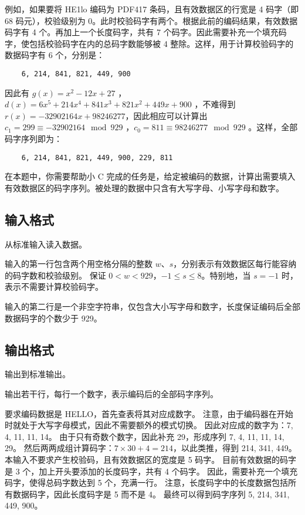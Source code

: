 例如，如果要将 HE1lo 编码为 PDF417 条码，且有效数据区的行宽是 4 码字（即 68 码元），校验级别为 0。此时校验码字有两个。根据此前的编码结果，有效数据码字有 4 个。再加上一个长度码字，共有 7 个码字。因此需要补充一个填充码字，使包括校验码字在内的总码字数能够被 4 整除。这样，用于计算校验码字的数据码字有 6 个，分别是：

\begin{lstlisting}
    6, 214, 841, 821, 449, 900
\end{lstlisting}

因此有 $g(x)=x^2-12x+27$
，$d(x)=6x^5+214x^4+841x^3+821x^2+449x+900$
，不难得到 $r(x)=-32902164x+98246277$，因此相应可以计算出 $c_1=299\equiv -32902164\mod 929$
，$c_0=811\equiv 98246277\mod 929$
。这样，全部码字序列即为：

\begin{lstlisting}
    6, 214, 841, 821, 449, 900, 229, 811
\end{lstlisting}

在本题中，你需要帮助小 C 完成的任务是，给定被编码的数据，计算出需要填入有效数据区的码字序列。被处理的数据中只含有大写字母、小写字母和数字。

\subsection*{输入格式}

从标准输入读入数据。

输入的第一行包含两个用空格分隔的整数 $w$、$s$，分别表示有效数据区每行能容纳的码字数和校验级别。
保证 $0<w<929$，$-1\le s\le 8$。特别地，当 $s=-1$ 时，表示不需要计算校验码字。

输入的第二行是一个非空字符串，仅包含大小写字母和数字，长度保证编码后全部数据码字的个数少于 929。

\subsection*{输出格式}

输出到标准输出。

输出若干行，每行一个数字，表示编码后的全部码字序列。

\examplebox*{}{}

要求编码数据是 HELLO，首先查表将其对应成数字。
注意，由于编码器在开始时就处于大写字母模式，因此不需要额外的模式切换。
因此对应成的数字为：7, 4, 11, 11, 14。
由于只有奇数个数字，因此补充 29，形成序列 7, 4, 11, 11, 14, 29。
然后两两成组计算码字：$7\times 30+4=214$，以此类推，得到 214, 341, 449。
本输入不要求产生校验码，且有效数据区的宽度是 5 码字。
目前有效数据的码字是 3 个，加上开头要添加的长度码字，共有 4 个码字。
因此，需要补充一个填充码字，使得总码字数达到 5 个，充满一行。
注意，长度码字中的长度数据包括所有数据码字，因此长度码字是 5 而不是 4。
最终可以得到码字序列 5, 214, 341, 449, 900。

